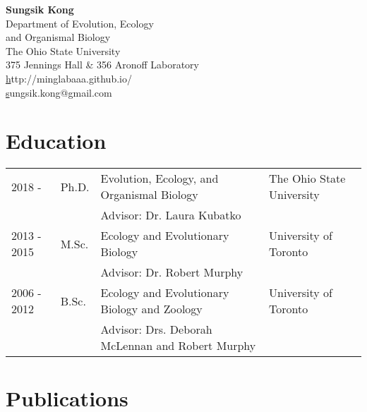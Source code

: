 \documentclass[10pt]{article}
\begin{document}
\pagestyle{plain}

\begin{center}
\huge \textbf{Sungsik Kong}\\
\large Department of Evolution, Ecology \\
and Organismal Biology\\
\large The Ohio State University\\
\large 375 Jennings Hall \& 356 Aronoff Laboratory\\
\small \href{http://minglabaaa.github.io}http://minglabaaa.github.io/\\
\small \href{mailto:sungsik.kong@gmail.com}sungsik.kong@gmail.com
\end{center}

\section*{Education}

\begin{longtable}{p{}  p{} p{} p{}}
2018 -   & Ph.D. & Evolution, Ecology, and Organismal Biology & The Ohio State University\\
 & & Advisor: Dr. Laura Kubatko\\
2013 - 2015 & {M.Sc.} & Ecology and Evolutionary Biology & University of Toronto\\
 & & Advisor: Dr. Robert Murphy\\
2006 - 2012 & {B.Sc.} & Ecology and Evolutionary Biology and Zoology & University of Toronto\\
 & & Advisor: Drs. Deborah McLennan and Robert Murphy\\
\end{longtable}



\section*{Publications}
\end{document}

